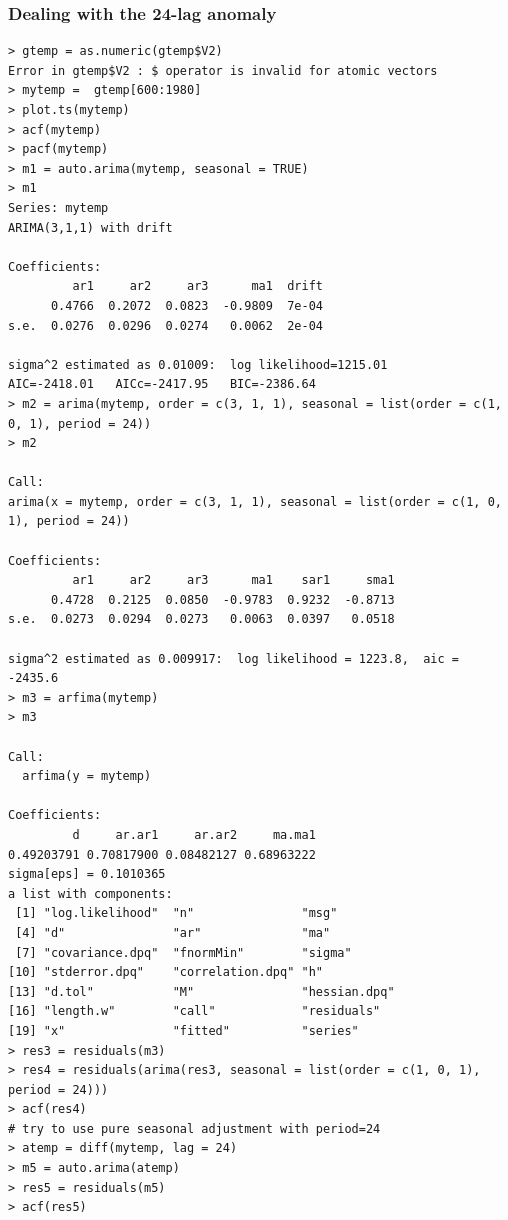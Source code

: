 \documentclass[a4paper,11pt]{article}
\begin{document}
\subsubsection{Dealing with the 24-lag anomaly}
\begin{verbatim}
> gtemp = as.numeric(gtemp$V2)
Error in gtemp$V2 : $ operator is invalid for atomic vectors
> mytemp =  gtemp[600:1980] 
> plot.ts(mytemp)
> acf(mytemp)
> pacf(mytemp)
> m1 = auto.arima(mytemp, seasonal = TRUE)
> m1
Series: mytemp 
ARIMA(3,1,1) with drift         

Coefficients:
         ar1     ar2     ar3      ma1  drift
      0.4766  0.2072  0.0823  -0.9809  7e-04
s.e.  0.0276  0.0296  0.0274   0.0062  2e-04

sigma^2 estimated as 0.01009:  log likelihood=1215.01
AIC=-2418.01   AICc=-2417.95   BIC=-2386.64
> m2 = arima(mytemp, order = c(3, 1, 1), seasonal = list(order = c(1, 0, 1), period = 24))
> m2

Call:
arima(x = mytemp, order = c(3, 1, 1), seasonal = list(order = c(1, 0, 1), period = 24))

Coefficients:
         ar1     ar2     ar3      ma1    sar1     sma1
      0.4728  0.2125  0.0850  -0.9783  0.9232  -0.8713
s.e.  0.0273  0.0294  0.0273   0.0063  0.0397   0.0518

sigma^2 estimated as 0.009917:  log likelihood = 1223.8,  aic = -2435.6
> m3 = arfima(mytemp)
> m3

Call:
  arfima(y = mytemp) 

Coefficients:
         d     ar.ar1     ar.ar2     ma.ma1 
0.49203791 0.70817900 0.08482127 0.68963222 
sigma[eps] = 0.1010365 
a list with components:
 [1] "log.likelihood"  "n"               "msg"            
 [4] "d"               "ar"              "ma"             
 [7] "covariance.dpq"  "fnormMin"        "sigma"          
[10] "stderror.dpq"    "correlation.dpq" "h"              
[13] "d.tol"           "M"               "hessian.dpq"    
[16] "length.w"        "call"            "residuals"      
[19] "x"               "fitted"          "series"  
> res3 = residuals(m3)
> res4 = residuals(arima(res3, seasonal = list(order = c(1, 0, 1), period = 24)))
> acf(res4) 
# try to use pure seasonal adjustment with period=24
> atemp = diff(mytemp, lag = 24)
> m5 = auto.arima(atemp)
> res5 = residuals(m5)
> acf(res5)
\end{verbatim}
\end{document}
